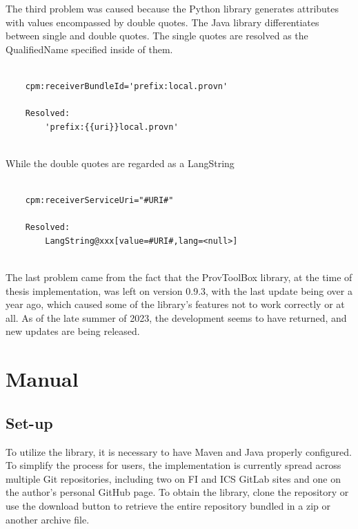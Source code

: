 \documentclass[
  digital,     %
  oneside,     %
  nosansbold,  %
  nocolorbold, %
  lof,         %
  lot,         %
]{fithesis4}
\begin{document}
The third problem was caused because the Python library generates attributes with values encompassed by double quotes. The Java library differentiates between single and double quotes. The single quotes are resolved as the QualifiedName specified inside of them.

\begin{verbatim}

    cpm:receiverBundleId='prefix:local.provn'
    
    Resolved:
        'prefix:{{uri}}local.provn'
        
\end{verbatim}

While the double quotes are regarded as a LangString

\begin{verbatim}

    cpm:receiverServiceUri="#URI#"
    
    Resolved:
        LangString@xxx[value=#URI#,lang=<null>]
        
\end{verbatim}

The last problem came from the fact that the ProvToolBox library, at the time of thesis implementation, was left on version 0.9.3, with the last update being over a year ago, which caused some of the library's features not to work correctly or at all. As of the late summer of 2023, the development seems to have returned, and new updates are being released.
\shorthandon{-}


\chapter{Manual}
\shorthandoff{-}
\section{Set-up}
To utilize the library, it is necessary to have Maven and Java properly configured. To simplify the process for users, the implementation is currently spread across multiple Git repositories, including two on FI and ICS GitLab sites and one on the author's personal GitHub page. To obtain the library, clone the repository or use the download button to retrieve the entire repository bundled in a zip or another archive file.
\end{document}
